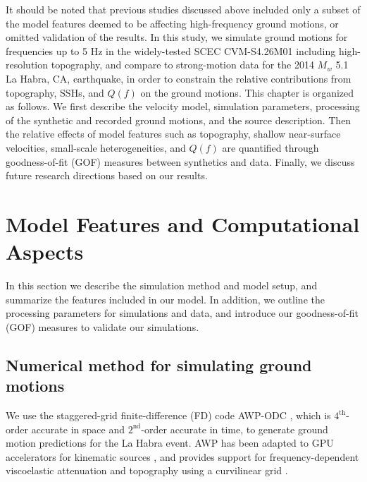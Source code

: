 It should be noted that previous studies discussed above included only a subset of the model features deemed to be affecting high-frequency ground motions, or omitted validation of the results. In this study, we simulate ground motions for frequencies up to 5 Hz in the widely-tested SCEC CVM-S4.26M01 including high-resolution topography, and compare to strong-motion data for the 2014 $M_w$ 5.1 La Habra, CA, earthquake, in order to constrain the relative contributions from topography, SSHs, and $Q(f)$ on the ground motions. This chapter is organized as follows. We first describe the velocity model, simulation parameters, processing of the synthetic and recorded ground motions, and the source description. Then the relative effects of model features such as topography, shallow near-surface velocities, small-scale heterogeneities, and $Q(f)$ are quantified through goodness-of-fit (GOF) measures between synthetics and data. Finally, we discuss future research directions based on our results.



\section{Model Features and Computational Aspects}\label{approach}

In this section we describe the simulation method and model setup, and summarize the features included in our model. In addition, we outline the processing parameters for simulations and data, and introduce our goodness-of-fit (GOF) measures to validate our simulations.

\subsection{Numerical method for simulating ground motions}
We use the staggered-grid finite-difference (FD) code AWP-ODC \citep[Anelastic Wave Propagation, Olsen-Day-Cui, from the authors of the code, hereafter denoted by AWP;][]{cuiScalableEarthquakeSimulation2010}, which is $4^{\text{th}}$-order accurate in space and $2^{\text{nd}}$-order accurate in time, to generate ground motion predictions for the La Habra event. AWP has been adapted to GPU accelerators for kinematic sources \citep{cui2013physics}, and provides support for frequency-dependent viscoelastic attenuation \citep{withersMemoryEfficientSimulation2015} and topography using a curvilinear grid \citep{oreillyHighorderFiniteDifference2021}. 

